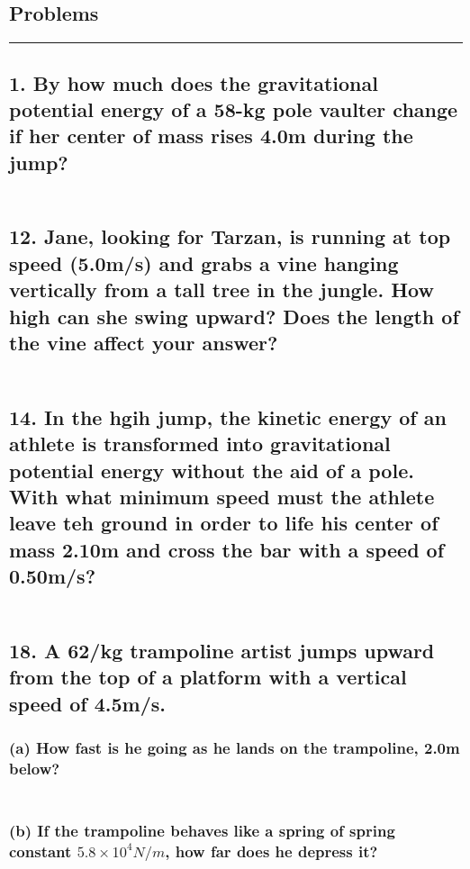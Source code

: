 \documentclass[12pt,a4paper,english]{article}
\begin{document}
\begin{flushleft}
  \section*{Problems}
  \hrule
  \subsection{1. By how much does the gravitational potential energy of a 58-kg pole vaulter change if her center of mass rises 4.0m during the jump?}
  \begin{align*}
  \end{align*}
  \subsection{12. Jane, looking for Tarzan, is running at top speed (5.0m/s) and grabs a vine hanging vertically from a tall tree in the jungle. How high can she swing upward? Does the length of the vine affect your answer?}
  \begin{align*}
  \end{align*}
  \subsection{14. In the hgih jump, the kinetic energy of an athlete is transformed into gravitational potential energy without the aid of a pole. With what minimum speed must the athlete leave teh ground in order to life his center of mass 2.10m and cross the bar with a speed of 0.50m/s?}
  \begin{align*}
  \end{align*}
  \subsection{18. A 62/kg trampoline artist jumps upward from the top of a platform with a vertical speed of 4.5m/s.}
  \subsubsection{(a) How fast is he going as he lands on the trampoline, 2.0m below?}
  \begin{align*}
  \end{align*}
  \subsubsection{(b) If the trampoline behaves like a spring of spring constant $5.8\times10^4N/m$, how far does he depress it?}
  \begin{align*}
  \end{align*}

\end{flushleft}
\end{document}
